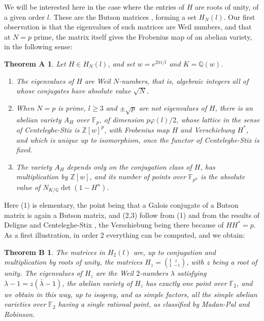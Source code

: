 \documentclass[11pt]{amsart}
\newtheorem*{theoremA}{Theorem A}
\newtheorem*{theoremB}{Theorem B}
\theoremstyle{definition}
\begin{document}
\medskip

We will be interested here in the case where the entries of $H$ are roots of unity, of a given order $l$. These are the Butson matrices \cite{but}, forming a set $H_N(l)$. Our first observation is that the eigenvalues of such matrices are Weil numbers, and that at $N=p$ prime, the matrix itself gives the Frobenius map of an abelian variety, in the following sense:

\begin{theoremA}
Let $H\in H_N(l)$, and set $w=e^{2\pi i/l}$ and $K=\mathbb Q(w)$.
\begin{enumerate}
\item The eigenvalues of $H$ are Weil $N$-numbers, that is, algebraic integers all of whose conjugates have absolute value $\sqrt{N}$.

\item When $N=p$ is prime, $l\geq3$ and $\pm\sqrt{p}$ are not eigenvalues of $H$, there is an abelian variety $A_H$ over $\mathbb F_p$, of dimension $p\varphi(l)/2$, whose lattice in the sense of Centeleghe-Stix is $\mathbb Z[w]^p$, with Frobenius map $H$ and Verschiebung $H^*$, and which is unique up to isomorphism, once the functor of Centeleghe-Stix is fixed.

\item The variety $A_H$ depends only on the conjugation class of $H$, has multiplication by $\mathbb Z[w]$, and its number of points over $\mathbb F_{p^n}$ is the absolute value of $N_{K/\mathbb Q}\det(1-H^n)$.
\end{enumerate}
\end{theoremA}

Here (1) is elementary, the point being that a Galois conjugate of a Butson matrix is again a Butson matrix, and (2,3) follow from (1) and from the results of Deligne \cite{del} and Centeleghe-Stix \cite{cst}, the Verschiebung being there because of $HH^*=p$. As a first illustration, in order 2 everything can be computed, and we obtain:

\begin{theoremB}
The matrices in $H_2(l)$ are, up to conjugation and multiplication by roots of unity, the matrices $H_z=(^1_1{\ }^{\ z}_{-z})$, with $z$ being a root of unity. The eigenvalues of $H_z$ are the Weil $2$-numbers $\lambda$ satisfying $\lambda-1=z(\bar{\lambda}-1)$, the abelian variety of $H_z$ has exactly one point over $\mathbb F_2$, and we obtain in this way, up to isogeny, and as simple factors, all the simple abelian varieties over $\mathbb F_2$ having a single rational point, as classified by Madan-Pal and Robinson.
\end{theoremB}
\end{document}
